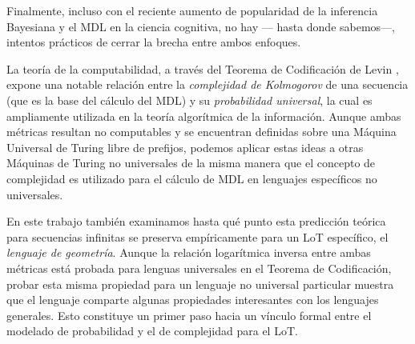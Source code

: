 Finalmente, incluso con el reciente aumento de popularidad de la inferencia Bayesiana y el MDL en la ciencia cognitiva, no hay --- hasta donde sabemos---, intentos prácticos de cerrar la brecha entre ambos enfoques.


La teoría de la computabilidad, a través del Teorema de Codificación de Levin \cite{levin1974laws}, expone una notable relación entre la {\em complejidad de Kolmogorov} de una secuencia (que es la base del cálculo del MDL) y su {\em probabilidad universal}, la cual es ampliamente utilizada en la teoría algorítmica de la información. Aunque ambas métricas resultan no computables y se encuentran definidas sobre una Máquina Universal de Turing libre de prefijos, podemos aplicar estas ideas a otras Máquinas de Turing no universales de la misma manera que el concepto de complejidad es utilizado para el cálculo de MDL en lenguajes específicos no universales. 


En este trabajo también examinamos hasta qué punto esta predicción teórica para secuencias infinitas se preserva empíricamente para un LoT específico, el \textit{lenguaje de geometría}. Aunque la relación logarítmica inversa entre ambas métricas está probada para lenguas universales en el Teorema de Codificación, probar esta misma propiedad para un lenguaje no universal particular muestra que el lenguaje comparte algunas propiedades interesantes con los lenguajes generales. Esto constituye un primer paso hacia un vínculo formal entre el modelado de probabilidad y el de complejidad para el LoT.

